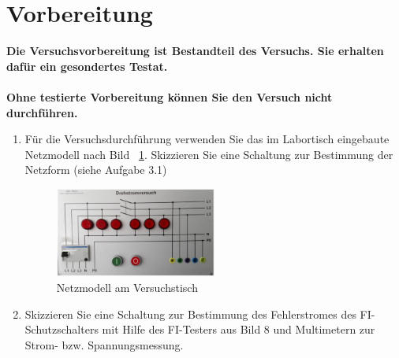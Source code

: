 \section{Vorbereitung}
\textbf{Die Versuchsvorbereitung ist Bestandteil des Versuchs. Sie erhalten dafür ein gesondertes Testat.\\\ \\
Ohne testierte Vorbereitung können Sie den Versuch nicht durchführen.  }
\begin{enumerate}[label=\alph*)]
  \item Für die Versuchsdurchführung verwenden Sie das im Labortisch eingebaute Netzmodell nach Bild ~\ref{img2.1.1}. Skizzieren Sie eine Schaltung zur Bestimmung der Netzform (siehe Aufgabe 3.1) 
    \begin{figure}[h!]
      \begin{center}
        \includegraphics[width=0.5\textwidth]{img/img2.1.1.png}
      \end{center}
      \caption{Netzmodell am Versuchstisch }\label{img2.1.1}
    \end{figure}
    
  \item Skizzieren Sie eine Schaltung zur Bestimmung des Fehlerstromes des FI-Schutzschalters mit Hilfe des FI-Testers aus Bild 8 und Multimetern zur Strom- bzw. Spannungsmessung. 
\end{enumerate}
